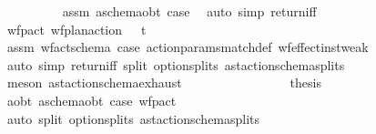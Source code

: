\begin{isabellebody}
\ \ \ \ \ \ \ \ \isamarkupfalse%
\ assm{}\ a\isactrlsub s\isactrlsub c\isactrlsub h\isactrlsub e\isactrlsub m\isactrlsub a{\isacharunderscore}{\kern0pt}obt\ case{\isacharunderscore}{\kern0pt}{\isasympi}\ \isamarkupfalse%
\ {\isacharparenleft}{\kern0pt}auto\ simp{\isacharcolon}{\kern0pt}\ return{\isacharunderscore}{\kern0pt}iff{\isacharparenright}{\kern0pt}\isanewline
\ \ \ \ \ \ \isamarkupfalse%
\ wf{\isacharunderscore}{\kern0pt}p{\isacharunderscore}{\kern0pt}act{\isacharcolon}{\kern0pt}\ {\isachardoublequoteopen}wf{\isacharunderscore}{\kern0pt}plan{\isacharunderscore}{\kern0pt}action\ {\isasympi}\ {\isasymand}\ t\isactrlsub {\isasympi}\ {\isasymge}\ {}{\isachardoublequoteclose}\isanewline
\ \ \ \ \ \ \ \ \isamarkupfalse%
\ assm{}\ wf{\isacharunderscore}{\kern0pt}act{\isacharunderscore}{\kern0pt}schema{\isacharunderscore}{\kern0pt}{\isasympi}\ case{\isacharunderscore}{\kern0pt}{\isasympi}\ action{\isacharunderscore}{\kern0pt}params{\isacharunderscore}{\kern0pt}match{\isacharunderscore}{\kern0pt}def\ wf{\isacharunderscore}{\kern0pt}effect{\isacharunderscore}{\kern0pt}inst{\isacharunderscore}{\kern0pt}weak\isanewline
\ \ \ \ \ \ \ \ \isamarkupfalse%
\ {\isacharparenleft}{\kern0pt}auto\ simp{\isacharcolon}{\kern0pt}\ return{\isacharunderscore}{\kern0pt}iff\ split{\isacharcolon}{\kern0pt}\ option{\isachardot}{\kern0pt}splits\ ast{\isacharunderscore}{\kern0pt}action{\isacharunderscore}{\kern0pt}schema{\isachardot}{\kern0pt}splits{\isacharparenright}{\kern0pt}\isanewline
\ \ \ \ \ \ \ \ \isamarkupfalse%
\ {\isacharparenleft}{\kern0pt}meson\ ast{\isacharunderscore}{\kern0pt}action{\isacharunderscore}{\kern0pt}schema{\isachardot}{\kern0pt}exhaust{\isacharparenright}{\kern0pt}{\isacharplus}{\kern0pt}\isanewline
\ \ \ \ \ \ \ \ \isamarkupfalse%
\isanewline
\ \ \ \ \ \ \isamarkupfalse%
\ {\isacharquery}{\kern0pt}thesis\ \isanewline
\ \ \ \ \ \ \ \ \isamarkupfalse%
\ a{\isacharunderscore}{\kern0pt}obt\ a\isactrlsub s\isactrlsub c\isactrlsub h\isactrlsub e\isactrlsub m\isactrlsub a{\isacharunderscore}{\kern0pt}obt\ case{\isacharunderscore}{\kern0pt}{\isasympi}\ wf{\isacharunderscore}{\kern0pt}p{\isacharunderscore}{\kern0pt}act\isanewline
\ \ \ \ \ \ \ \ \isamarkupfalse%
\ {\isacharparenleft}{\kern0pt}auto\ split{\isacharcolon}{\kern0pt}\ option{\isachardot}{\kern0pt}splits\ ast{\isacharunderscore}{\kern0pt}action{\isacharunderscore}{\kern0pt}schema{\isachardot}{\kern0pt}splits{\isacharparenright}{\kern0pt}\isanewline

\end{isabellebody}
